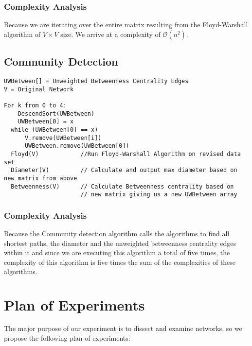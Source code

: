 \documentclass{article}
\begin{document}
\subsubsection{Complexity Analysis}
Because we are iterating over the entire matrix resulting from the Floyd-Warshall algorithm of $V \times V$ size. We arrive at a complexity of $\mathcal{O}(n^2)$.

\subsection{Community Detection}
\begin{verbatim}
UWBetween[] = Unweighted Betweenness Centrality Edges
V = Original Network

For k from 0 to 4:
    DescendSort(UWBetween)
    UWBetween[0] = x
  while (UWBetween[0] == x)
      V.remove(UWBetween[i])
      UWBetween.remove(UWBetween[0])
  Floyd(V)            //Run Floyd-Warshall Algorithm on revised data set
  Diameter(V)         // Calculate and output max diameter based on new matrix from above
  Betweenness(V)      // Calculate Betweenness centrality based on
                      // new matrix giving us a new UWBetween array
\end{verbatim}

\subsubsection{Complexity Analysis}
Because the Community detection algorithm calls the algorithms to find all shortest paths, the diameter and the unweighted betweenness centrality edges within it and since we are executing this algorithm a total of five times, the complexity of this algorithm is five times the sum of the complexities of these algorithms.

\section{Plan of Experiments}
The major purpose of our experiment is to dissect and examine networks, so we propose the following plan of experiments:
\end{document}
